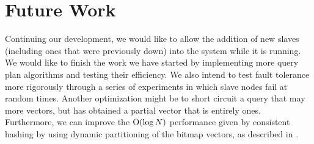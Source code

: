 \section{Future Work}
Continuing our development, we would like to allow the addition of new slaves
(including ones that were previously down) into the system while it is running.
We would like to finish the work we have started by implementing more
query plan algorithms and testing their efficiency. We also intend to test
fault tolerance more rigorously through a series of experiments in which
slave nodes fail at random times. Another optimization might be to short
circuit a query that may  more vectors, but has obtained a partial
vector that is entirely ones. Furthermore, we can improve the
\(\mathrm{O}(\log{N})\) performance given by consistent hashing by using dynamic
partitioning of the bitmap vectors, as described in \cite{kleppman2017}.
